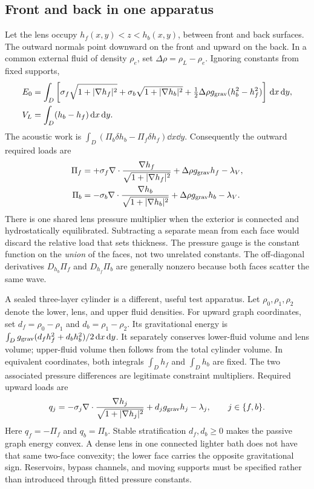 \subsection{Front and back in one apparatus}
Let the lens occupy $h_f(x,y)<z<h_b(x,y)$, between front and back surfaces.
The outward normals point downward on the front and upward on the back. In a
common external fluid of density $\rho_e$, set $\Delta\rho=\rho_L-\rho_e$.
Ignoring constants from fixed supports,
\begin{align}
 E_0&=\int_D\left[\sigma_f\sqrt{1+|\nabla h_f|^2}
       +\sigma_b\sqrt{1+|\nabla h_b|^2}
       +\tfrac12\Delta\rho g_{\rm grav}(h_b^2-h_f^2)\right]\,\mathrm d x\,\mathrm d y,\\
 V_L&=\int_D(h_b-h_f)\,\mathrm d x\,\mathrm d y.
 \label{eq:dual-face-energy}
\end{align}
The acoustic work is $\int_D(\Pi_b\delta h_b-\Pi_f\delta h_f)\dd x\dd y$.
Consequently the outward required loads are
\begin{align}
 \Pi_f&=+\sigma_f\nabla\cdot\frac{\nabla h_f}{\sqrt{1+|\nabla h_f|^2}}
                   +\Delta\rho g_{\rm grav}h_f-\lambda_V,\\
 \Pi_b&=-\sigma_b\nabla\cdot\frac{\nabla h_b}{\sqrt{1+|\nabla h_b|^2}}
                   +\Delta\rho g_{\rm grav}h_b-\lambda_V.
 \label{eq:two-face-loads}
\end{align}
There is one shared lens pressure multiplier when the exterior is connected
and hydrostatically equilibrated. Subtracting a separate mean from each face
would discard the relative load that sets thickness. The pressure gauge is
the constant function on the \emph{union} of the faces, not two unrelated
constants. The off-diagonal derivatives $D_{h_b}\Pi_f$ and $D_{h_f}\Pi_b$
are generally nonzero because both faces scatter the same wave.

A sealed three-layer cylinder is a different, useful test apparatus. Let
$\rho_0,\rho_1,\rho_2$ denote the lower, lens, and upper fluid densities.
For upward graph coordinates, set $d_f=\rho_0-\rho_1$ and
$d_b=\rho_1-\rho_2$. Its gravitational energy is
$\int_D g_{\rm grav}(d_f h_f^2+d_b h_b^2)/2\,\mathrm d x\,\mathrm d y$.
It separately conserves lower-fluid volume and lens volume; upper-fluid volume
then follows from the total cylinder volume. In equivalent coordinates,
both integrals $\int_Dh_f$ and $\int_Dh_b$ are fixed. The two associated
pressure differences are legitimate constraint multipliers. Required upward
loads are
\begin{equation}
 q_j=-\sigma_j\nabla\cdot\frac{\nabla h_j}{\sqrt{1+|\nabla h_j|^2}}
          +d_jg_{\rm grav}h_j-\lambda_j,\qquad j\in\{f,b\}.
 \label{eq:sealed-three-phase}
\end{equation}
Here $q_f=-\Pi_f$ and $q_b=\Pi_b$. Stable stratification $d_f,d_b\geq0$
makes the passive graph energy convex. A dense lens in one connected lighter
bath does not have that same two-face convexity; the lower face carries the
opposite gravitational sign. Reservoirs, bypass channels, and moving supports
must be specified rather than introduced through fitted pressure constants.

